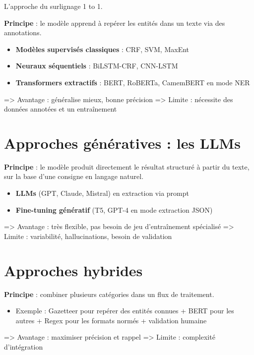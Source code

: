 L'approche du surlignage 1 to 1.

\textbf{Principe} : le modèle apprend à repérer les entités dans un texte via des annotations.

\begin{itemize}
\item \textbf{Modèles supervisés classiques} : CRF, SVM, MaxEnt
\end{itemize}

\begin{itemize}
\item \textbf{Neuraux séquentiels} : BiLSTM-CRF, CNN-LSTM
\end{itemize}

\begin{itemize}
\item \textbf{Transformers extractifs} : BERT, RoBERTa, CamemBERT en mode NER  
\end{itemize}
  => Avantage : généralise mieux, bonne précision  
  => Limite : nécessite des données annotées et un entraînement

\section{Approches génératives : les LLMs}

\textbf{Principe} : le modèle produit directement le résultat structuré à partir du texte, sur la base d’une consigne en langage naturel.

\begin{itemize}
\item \textbf{LLMs} (GPT, Claude, Mistral) en extraction via prompt
\end{itemize}

\begin{itemize}
\item \textbf{Fine-tuning génératif} (T5, GPT-4 en mode extraction JSON)  
\end{itemize}
  => Avantage : très flexible, pas besoin de jeu d’entraînement spécialisé  
  => Limite : variabilité, hallucinations, besoin de validation

\section{Approches hybrides}

\textbf{Principe} : combiner plusieurs catégories dans un flux de traitement.

\begin{itemize}
\item Exemple : Gazetteer pour repérer des entités connues + BERT pour les autres + Regex pour les formats normés + validation humaine  
\end{itemize}
  => Avantage : maximiser précision et rappel  
  => Limite : complexité d’intégration


